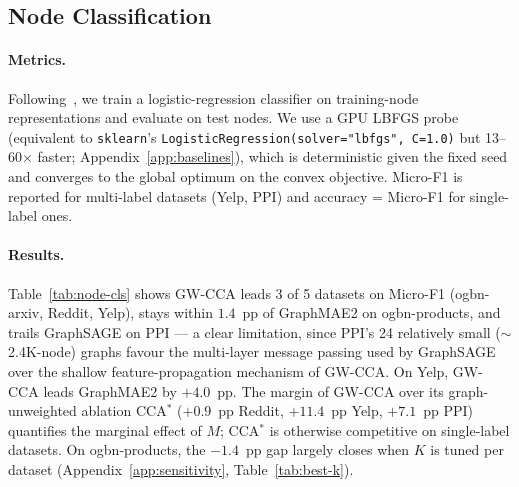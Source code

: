\documentclass{article}
\begin{document}
\subsection{Node Classification}
\paragraph{Metrics.}
Following~\citet{hamilton2017inductive}, we train a logistic-regression
classifier on training-node representations and evaluate on test nodes. We
use a GPU LBFGS probe (equivalent to \texttt{sklearn}'s
\texttt{LogisticRegression(solver="lbfgs", C=1.0)} but 13--60$\times$ faster;
Appendix~\ref{app:baselines}), which is deterministic given the fixed seed
and converges to the global optimum on the convex objective. Micro-F1 is
reported for multi-label datasets (Yelp, PPI) and accuracy = Micro-F1 for
single-label ones.

\paragraph{Results.}
Table~\ref{tab:node-cls} shows GW-CCA leads 3 of 5 datasets on Micro-F1
(ogbn-arxiv, Reddit, Yelp), stays within $1.4$~pp of GraphMAE2 on
ogbn-products, and trails GraphSAGE on PPI --- a clear
limitation, since PPI's 24 relatively small ($\sim$2.4K-node) graphs
favour the multi-layer message passing used by GraphSAGE over the
shallow feature-propagation mechanism of GW-CCA. On Yelp, GW-CCA leads
GraphMAE2 by $+4.0$~pp. The margin of GW-CCA over its graph-unweighted
ablation CCA$^\ast$ ($+0.9$~pp Reddit, $+11.4$~pp Yelp, $+7.1$~pp PPI)
quantifies the marginal effect of $M$; CCA$^\ast$ is
otherwise competitive on single-label datasets.
On ogbn-products, the $-1.4$~pp gap largely closes when
$K$ is tuned per dataset (Appendix~\ref{app:sensitivity},
Table~\ref{tab:best-k}).
\end{document}
